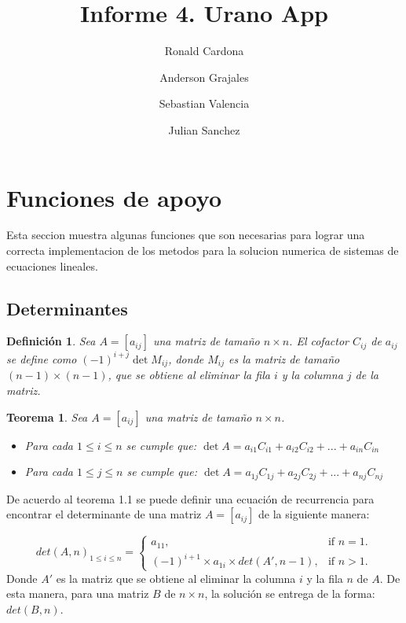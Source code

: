 \documentclass[12pt]{article}
\title{Informe 4. Urano App}
\author {Ronald Cardona
    \and Anderson Grajales
    \and Sebastian Valencia
    \and Julian Sanchez}
\newtheorem{definition}{Definición}[section]
\newtheorem{theorem}{Teorema}[section]
\begin{document}
        \maketitle
        \section{Funciones de apoyo}
        Esta seccion muestra algunas funciones que son necesarias para lograr una correcta implementacion de los metodos para la solucion numerica de sistemas de ecuaciones lineales.
        \subsection{Determinantes}
        \begin{definition}
            Sea $A = [a_{ij}]$ una matriz de tamaño $n \times n$. El cofactor $C_{ij}$ de $a_{ij}$ se define como $(-1)^{i+j}\det {M_{ij}}$, donde $M_{ij}$ es la matriz de tamaño $(n - 1) \times (n - 1)$, que se obtiene al eliminar la fila $i$ y la columna $j$ de la matriz.\cite{algebralineal}
        \end{definition}
        \begin{theorem}
            Sea $A=[a_{ij}]$ una matriz de tamaño $n \times n$. \cite{algebralineal}
            \begin{itemize}
                \item Para cada $1\leq i \leq n$ se cumple que:
                $\det {A} = a_{i1}C_{i1} + a_{i2}C_{i2} + ... + a_{in}C_{in}$
                \item Para cada $1\leq j \leq n$ se cumple que:
                $\det {A} = a_{1j}C_{1j} + a_{2j}C_{2j} + ... + a_{nj}C_{nj}$
            \end{itemize}
        \end{theorem}
        De acuerdo al teorema 1.1 se puede definir una ecuación de recurrencia para encontrar el determinante de una matriz $A = [a_{ij}]$ de la siguiente manera:
        
        \begin{equation}
        det(A, n)_{1\leq i \leq n}=\begin{cases}
        a_{11}, & \text{if $n = 1$}.\\
        (-1)^{i+1} \times a_{1i} \times det(A', n - 1) , & \text{if $n > 1$}.
        \end{cases}
        \end{equation}
        Donde $A'$ es la matriz que se obtiene al eliminar la columna $i$ y la fila $n$ de $A$. De esta manera, para una matriz $B$ de $n \times n$, la solución se entrega de la forma:
        $det(B, n)$.
        
\end{document}
